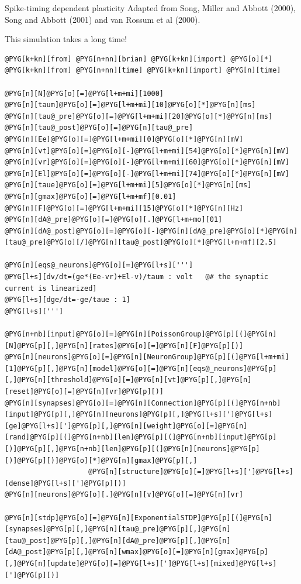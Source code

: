 \documentclass[letterpaper,10pt,english]{manual}
\begin{document}
Spike-timing dependent plasticity
Adapted from Song, Miller and Abbott (2000), Song and Abbott (2001)
and van Rossum et al (2000).

This simulation takes a long time!

\begin{Verbatim}[commandchars=@\[\]]
@PYG[k+kn][from] @PYG[n+nn][brian] @PYG[k+kn][import] @PYG[o][*]
@PYG[k+kn][from] @PYG[n+nn][time] @PYG[k+kn][import] @PYG[n][time]

@PYG[n][N]@PYG[o][=]@PYG[l+m+mi][1000]
@PYG[n][taum]@PYG[o][=]@PYG[l+m+mi][10]@PYG[o][*]@PYG[n][ms]
@PYG[n][tau@_pre]@PYG[o][=]@PYG[l+m+mi][20]@PYG[o][*]@PYG[n][ms]
@PYG[n][tau@_post]@PYG[o][=]@PYG[n][tau@_pre]
@PYG[n][Ee]@PYG[o][=]@PYG[l+m+mi][0]@PYG[o][*]@PYG[n][mV]
@PYG[n][vt]@PYG[o][=]@PYG[o][-]@PYG[l+m+mi][54]@PYG[o][*]@PYG[n][mV]
@PYG[n][vr]@PYG[o][=]@PYG[o][-]@PYG[l+m+mi][60]@PYG[o][*]@PYG[n][mV]
@PYG[n][El]@PYG[o][=]@PYG[o][-]@PYG[l+m+mi][74]@PYG[o][*]@PYG[n][mV]
@PYG[n][taue]@PYG[o][=]@PYG[l+m+mi][5]@PYG[o][*]@PYG[n][ms]
@PYG[n][gmax]@PYG[o][=]@PYG[l+m+mf][0.01]
@PYG[n][F]@PYG[o][=]@PYG[l+m+mi][15]@PYG[o][*]@PYG[n][Hz]
@PYG[n][dA@_pre]@PYG[o][=]@PYG[o][.]@PYG[l+m+mo][01]
@PYG[n][dA@_post]@PYG[o][=]@PYG[o][-]@PYG[n][dA@_pre]@PYG[o][*]@PYG[n][tau@_pre]@PYG[o][/]@PYG[n][tau@_post]@PYG[o][*]@PYG[l+m+mf][2.5]

@PYG[n][eqs@_neurons]@PYG[o][=]@PYG[l+s][''']
@PYG[l+s][dv/dt=(ge*(Ee-vr)+El-v)/taum : volt   @# the synaptic current is linearized]
@PYG[l+s][dge/dt=-ge/taue : 1]
@PYG[l+s][''']

@PYG[n+nb][input]@PYG[o][=]@PYG[n][PoissonGroup]@PYG[p][(]@PYG[n][N]@PYG[p][,]@PYG[n][rates]@PYG[o][=]@PYG[n][F]@PYG[p][)]
@PYG[n][neurons]@PYG[o][=]@PYG[n][NeuronGroup]@PYG[p][(]@PYG[l+m+mi][1]@PYG[p][,]@PYG[n][model]@PYG[o][=]@PYG[n][eqs@_neurons]@PYG[p][,]@PYG[n][threshold]@PYG[o][=]@PYG[n][vt]@PYG[p][,]@PYG[n][reset]@PYG[o][=]@PYG[n][vr]@PYG[p][)]
@PYG[n][synapses]@PYG[o][=]@PYG[n][Connection]@PYG[p][(]@PYG[n+nb][input]@PYG[p][,]@PYG[n][neurons]@PYG[p][,]@PYG[l+s][']@PYG[l+s][ge]@PYG[l+s][']@PYG[p][,]@PYG[n][weight]@PYG[o][=]@PYG[n][rand]@PYG[p][(]@PYG[n+nb][len]@PYG[p][(]@PYG[n+nb][input]@PYG[p][)]@PYG[p][,]@PYG[n+nb][len]@PYG[p][(]@PYG[n][neurons]@PYG[p][)]@PYG[p][)]@PYG[o][*]@PYG[n][gmax]@PYG[p][,]
                    @PYG[n][structure]@PYG[o][=]@PYG[l+s][']@PYG[l+s][dense]@PYG[l+s][']@PYG[p][)]
@PYG[n][neurons]@PYG[o][.]@PYG[n][v]@PYG[o][=]@PYG[n][vr]

@PYG[n][stdp]@PYG[o][=]@PYG[n][ExponentialSTDP]@PYG[p][(]@PYG[n][synapses]@PYG[p][,]@PYG[n][tau@_pre]@PYG[p][,]@PYG[n][tau@_post]@PYG[p][,]@PYG[n][dA@_pre]@PYG[p][,]@PYG[n][dA@_post]@PYG[p][,]@PYG[n][wmax]@PYG[o][=]@PYG[n][gmax]@PYG[p][,]@PYG[n][update]@PYG[o][=]@PYG[l+s][']@PYG[l+s][mixed]@PYG[l+s][']@PYG[p][)]


\end{Verbatim}
\end{document}
